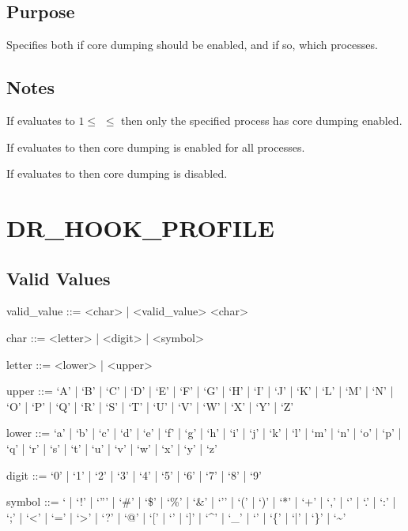 \documentclass[letterpaper,10pt,english]{sphinxmanual}
\begin{document}
\subsection{Purpose}
\label{\detokenize{flag/flag:id61}}
\sphinxAtStartPar
Specifies both if core dumping should be enabled, and if so, which processes.


\subsection{Notes}
\label{\detokenize{flag/flag:id62}}
\sphinxAtStartPar
If  evaluates to \(1\leq\)  \(\leq\)  then only the specified process has core dumping enabled.

\sphinxAtStartPar
If  evaluates to  then core dumping is enabled for all processes.

\sphinxAtStartPar
If  evaluates to  then core dumping is disabled.


\section{DR\_HOOK\_PROFILE}
\label{\detokenize{flag/flag:dr-hook-profile}}\label{\detokenize{flag/flag:id65}}

\subsection{Valid Values}
\label{\detokenize{flag/flag:id66}}
\begin{DUlineblock}{0em}
\item[] valid\_value ::= \textless{}char\textgreater{} | \textless{}valid\_value\textgreater{} \textless{}char\textgreater{}
\item[] char ::= \textless{}letter\textgreater{} | \textless{}digit\textgreater{} | \textless{}symbol\textgreater{}
\item[] letter ::= \textless{}lower\textgreater{} | \textless{}upper\textgreater{}
\item[] upper ::= ‘A’ | ‘B’ | ‘C’ | ‘D’ | ‘E’ | ‘F’ | ‘G’ | ‘H’ | ‘I’ | ‘J’ | ‘K’ | ‘L’ | ‘M’ | ‘N’ | ‘O’ | ‘P’ | ‘Q’ | ‘R’ | ‘S’ | ‘T’ | ‘U’ | ‘V’ | ‘W’ | ‘X’ | ‘Y’ | ‘Z’
\item[] lower ::= ‘a’ | ‘b’ | ‘c’ | ‘d’ | ‘e’ | ‘f’ | ‘g’ | ‘h’ | ‘i’ | ‘j’ | ‘k’ | ‘l’ | ‘m’ | ‘n’ | ‘o’ | ‘p’ | ‘q’ | ‘r’ | ‘s’ | ‘t’ | ‘u’ | ‘v’ | ‘w’ | ‘x’ | ‘y’ | ‘z’
\item[] digit ::= ‘0’ | ‘1’ | ‘2’ | ‘3’ | ‘4’ | ‘5’ | ‘6’ | ‘7’ | ‘8’ | ‘9’
\item[] symbol ::= ‘ \textquotesingle{} | ‘!’ | ‘”’ | ‘\#’ | ‘\$’ | ‘\%’ | ‘\&’ | ‘’’ | ‘(’ | ‘)’ | ‘*’ | ‘+’ | ‘,’ | ‘\sphinxhyphen{}’ | ‘.’ | ‘:’ | ‘;’ | ‘\textless{}’ | ‘=’ | ‘\textgreater{}’ | ‘?’ | ‘@’ | ‘{[}’ | ‘’ | ‘{]}’ | ‘\textasciicircum{}’ | ‘\_’ | ‘\textasciigrave{}’ | ‘\{’ | ‘|’ | ‘\}’ | ‘\textasciitilde{}’
\end{DUlineblock}
\end{document}
